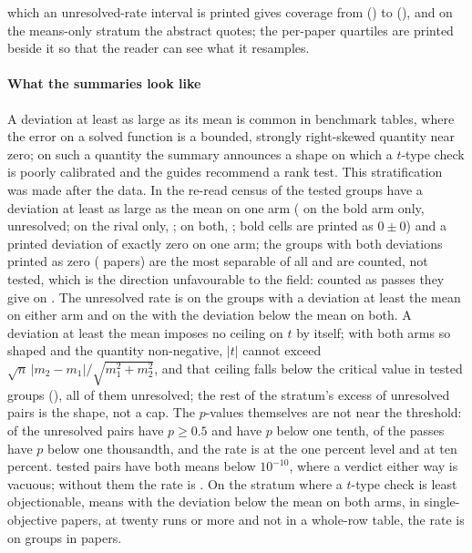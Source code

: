 \documentclass[preprint,review,12pt]{elsarticle}
\begin{document}
which an unresolved-rate interval is printed gives coverage from \nCrcCovMin{} (\nCrcCovMinStratum{}) to \nCrcCovMax{} (\nCrcCovMaxStratum{}), and \nCrcCovMeansOnly{} on the means-only stratum the abstract quotes; the per-paper quartiles are printed beside it so that the reader can see what it resamples.

\paragraph{What the summaries look like} A deviation at least as large as its mean is common in benchmark tables, where the error on a solved function is a bounded, strongly right-skewed quantity near zero; on such a quantity the summary announces a shape on which a $t$-type check is poorly calibrated and the guides recommend a rank test. This stratification was made after the data. In the re-read census \nCrcShPctTestedSdGeMean{} of the tested groups have a deviation at least as large as the mean on one arm (\nCrcShSdGeMeanBoldOnlyTested{} on the bold arm only, \nCrcShSdGeMeanBoldOnlyFail{} unresolved; \nCrcShSdGeMeanRivalOnlyTested{} on the rival only, \nCrcShSdGeMeanRivalOnlyFail{}; \nCrcShSdGeMeanBothTested{} on both, \nCrcShSdGeMeanBothFail{}; \nCrcShBoldZeroPmZero{} bold cells are printed as $0 \pm 0$) and \nCrcShPctTestedZeroSd{} a printed deviation of exactly zero on one arm; the \nCrcShZeroBothGroups{} groups with both deviations printed as zero (\nCrcShZeroBothPapers{} papers) are the most separable of all and are counted, not tested, which is the direction unfavourable to the field: counted as passes they give \nCrcShZeroBothAsPassPctFail{} on \nCrcShZeroBothAsPassTested{}. The unresolved rate is \nCrcShSdGeMeanFail{} on the \nCrcShSdGeMeanTested{} groups with a deviation at least the mean on either arm and \nCrcShSdLtMeanFail{} \nCrcShSdLtMeanFailCi{} on the \nCrcShSdLtMeanTested{} with the deviation below the mean on both. A deviation at least the mean imposes no ceiling on $t$ by itself; with both arms so shaped and the quantity non-negative, $|t|$ cannot exceed $\sqrt{n}\,|m_2 - m_1| / \sqrt{m_1^2 + m_2^2}$, and that ceiling falls below the critical value in \nCrcShCeilingBinds{} tested groups (\nCrcShCeilingBindsPctTested{}), all of them unresolved; the rest of the stratum's excess of unresolved pairs is the shape, not a cap. The $p$-values themselves are not near the threshold: \nCrcPdFailPAtLeastHalf{} of the unresolved pairs have $p \geq 0.5$ and \nCrcPdFailPBelowTenth{} have $p$ below one tenth, \nCrcPdPassPBelowThousandth{} of the passes have $p$ below one thousandth, and the rate is \nCrcPdPctFailAtOnePercent{} at the one percent level and \nCrcPdPctFailAtTenPercent{} at ten percent. \nCrcPdBothMeansBelowFloor{} tested pairs have both means below $10^{-10}$, where a verdict either way is vacuous; without them the rate is \nCrcPdWithoutFloorFail{}. On the stratum where a $t$-type check is least objectionable, means with the deviation below the mean on both arms, in single-objective papers, at twenty runs or more and not in a whole-row table, the rate is \nCrcLeastFail{} \nCrcLeastFailCi{} on \nCrcLeastTested{} groups in \nCrcLeastTestedPapers{} papers.
\end{document}
